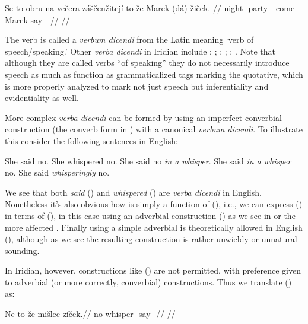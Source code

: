 \pex
  \begingl
    \gla Se to obru na večera záščenžitejí to-že Marek (dá) žiček. //
    \glb \Refl{} \Dem{} night-\Ins{} \Loc{} party-\Acc{} \Neg{}-come-\Av{}-\SupP{}-\Quot{} \Qp{} Marek \First\Sg{} say-\Av{}-\Pf{} //
    \glft {}//
  \endgl
\xe

The verb  is called a \emph{verbum dicendi} from the Latin meaning ‘verb of speech/speaking.’ Other \emph{verba
dicendi} in Iridian include ; ;
; ; ;
. Note that although they are called
verbs ``of speaking'' they do not necessarily introduce speech as much as
function as grammaticalized tags marking the quotative,  which is more properly
analyzed to mark not just speech but inferentiality and evidentiality as well.

More complex \emph{verba dicendi} can be formed by using an imperfect converbial
construction (the converb form in ) with a canonical \emph{verbum
dicendi}. To illustrate this consider the following sentences in English:

\pex[*=?*,interpartskip=0pt]
\a She said no.
\a She whispered no.
\a She said no \emph{in a whisper}.
\a {} She said \emph{in a whisper} no.
\a {} She said \emph{whisperingly} no.
\xe

We see that both \emph{said} () and \emph{whispered}
() are \emph{verba dicendi} in English. Nonetheless it's also
obvious how  is simply a function of (), i.e.,
we can express () in terms of (), in this case
using an adverbial construction () as we see in
 or the more affected . Finally using a simple
adverbial is theoretically allowed in English (), although as
we see the resulting construction is rather unwieldy or unnatural-sounding.

In Iridian, however, constructions like () are not permitted,
with preference given to adverbial (or more correctly,
converbial) constructions. Thus we translate ()
as:

\pex
\begingl
\gla Ne to-že mišlec zíček.//
\glb no  whisper-\Cv{} say-\Av{}-\Pf{}//
\glft {}//
\endgl
\xe

